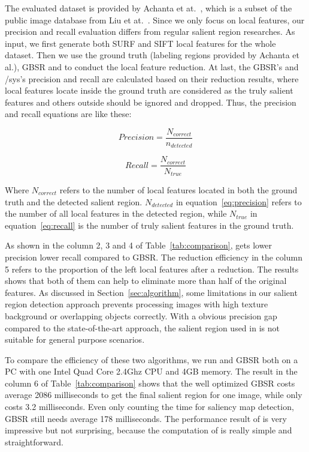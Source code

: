 The evaluated dataset is provided by Achanta et at.~\cite{achanta2009frequency}, which is a subset of the public image database from Liu et at.~\cite{liu2011learning}. Since we only focus on local features, our precision and recall evaluation differs from regular salient region researches. As input, we first generate both SURF and SIFT local features for the whole dataset. Then we use the ground truth (labeling regions provided by Achanta et al.), GBSR and {\sys} to conduct the local feature reduction. At last, the GBSR's and {/sys}'s precision and recall are calculated based on their reduction results, where local features locate inside the ground truth are considered as the truly salient features and others outside should be ignored and dropped. Thus, the precision and recall equations are like these:

{\begin{equation} \label{eq:precision}
Precision = \frac{{N}_{correct}}{{n}_{detected}}
\end{equation}}

{\begin{equation} \label{eq:recall}
Recall = \frac{{N}_{correct}}{{N}_{true}}
\end{equation}}

Where ${N}_{correct}$ refers to the number of local features located in both the ground truth and the detected salient region. ${N}_{detected}$ in equation~\ref{eq:precision} refers to the number of all local features in the detected region, while ${N}_{true}$ in equation~\ref{eq:recall} is the number of truly salient features in the ground truth.

As shown in the column 2, 3 and 4 of Table~\ref{tab:comparison}, {\sys} gets lower precision lower recall compared to GBSR. The reduction efficiency in the column 5 refers to the proportion of the left local features after a reduction. The results shows that both of them can help to eliminate more than half of the original features. As discussed in Section~\ref{sec:algorithm}, some limitations in our salient region detection approach prevents processing images with high texture background or overlapping objects correctly. With a obvious precision gap compared to the state-of-the-art approach, the salient region used in {\sys} is not suitable for general purpose scenarios.

To compare the efficiency of these two algorithms, we run {\sys} and GBSR both on a PC with one Intel Quad Core 2.4Ghz CPU and 4GB memory. The result in the column 6 of Table~\ref{tab:comparison} shows that the well optimized GBSR costs average 2086 milliseconds to get the final salient region for one image, while {\sys} only costs 3.2 milliseconds. Even only counting the time for saliency map detection, GBSR still needs average 178 milliseconds. The performance result of {\sys} is very impressive but not surprising, because the computation of {\sys} is really simple and straightforward.

